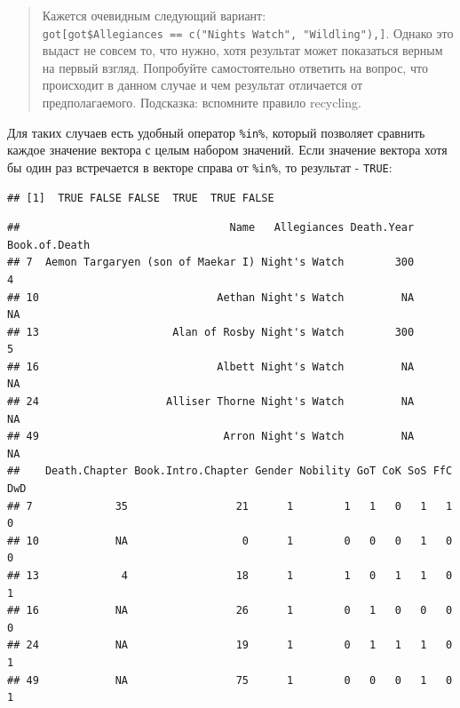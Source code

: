 \documentclass[]{book}
\newenvironment{Shaded}{\begin{snugshade}}{\end{snugshade}}
\newcommand{\KeywordTok}[1]{\textcolor[rgb]{0.13,0.29,0.53}{\textbf{#1}}}
\newcommand{\DecValTok}[1]{\textcolor[rgb]{0.00,0.00,0.81}{#1}}
\newcommand{\StringTok}[1]{\textcolor[rgb]{0.31,0.60,0.02}{#1}}
\newcommand{\OperatorTok}[1]{\textcolor[rgb]{0.81,0.36,0.00}{\textbf{#1}}}
\newcommand{\NormalTok}[1]{#1}
\begin{document}
\begin{quote}
Кажется очевидным следующий вариант:
\texttt{got{[}got\$Allegiances\ ==\ c("Night\textquotesingle{}s\ Watch",\ "Wildling"),{]}}.
Однако это выдаст не совсем то, что нужно, хотя результат может
показаться верным на первый взгляд. Попробуйте самостоятельно ответить
на вопрос, что происходит в данном случае и чем результат отличается от
предполагаемого. Подсказка: вспомните правило recycling.
\end{quote}

Для таких случаев есть удобный оператор \texttt{\%in\%}, который
позволяет сравнить каждое значение вектора с целым набором значений.
Если значение вектора хотя бы один раз встречается в векторе справа от
\texttt{\%in\%}, то результат - \texttt{TRUE}:

\begin{Shaded}
\end{Shaded}

\begin{verbatim}
## [1]  TRUE FALSE FALSE  TRUE  TRUE FALSE
\end{verbatim}

\begin{Shaded}
\end{Shaded}

\begin{verbatim}
##                                 Name   Allegiances Death.Year Book.of.Death
## 7  Aemon Targaryen (son of Maekar I) Night's Watch        300             4
## 10                            Aethan Night's Watch         NA            NA
## 13                     Alan of Rosby Night's Watch        300             5
## 16                            Albett Night's Watch         NA            NA
## 24                    Alliser Thorne Night's Watch         NA            NA
## 49                             Arron Night's Watch         NA            NA
##    Death.Chapter Book.Intro.Chapter Gender Nobility GoT CoK SoS FfC DwD
## 7             35                 21      1        1   1   0   1   1   0
## 10            NA                  0      1        0   0   0   1   0   0
## 13             4                 18      1        1   0   1   1   0   1
## 16            NA                 26      1        0   1   0   0   0   0
## 24            NA                 19      1        0   1   1   1   0   1
## 49            NA                 75      1        0   0   0   1   0   1
\end{verbatim}
\end{document}
